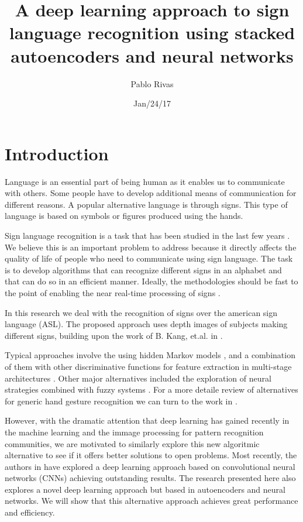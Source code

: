 \documentclass[a4paper]{article}
\title{A deep learning approach to sign language recognition using stacked 
autoencoders and neural networks}
\author{Pablo Rivas}
\date{Jan/24/17}
\begin{document}
\lstset{language=Python}

\maketitle

\section{Introduction}

Language is an essential part of being human as it enables us to communicate
with others. Some people have to develop additional means of communication
for different reasons. A popular alternative language is through signs. This
type of language is based on symbols or figures produced using the hands. 

Sign language recognition is a task that has been studied in the last few years
\cite{starner1998real}. We believe this is an important problem to address
because it directly affects the quality of life of people who need to
communicate using sign language. The task is to develop algorithms that can
recognize different signs in an alphabet and that can do so in an efficient
manner. Ideally, the methodologies should be fast to the point of enabling the 
near real-time processing of signs \cite{starner1997real}.

In this research we deal with the recognition of signs over the american sign
language (ASL). The proposed approach uses depth images of subjects making
different signs, building upon the work of B. Kang, et.al. in
\cite{kang2015real}. 

Typical approaches involve the using hidden Markov models
\cite{starner1997real}, and a combination of them with other discriminative
functions for feature extraction in multi-stage architectures
\cite{lichtenauer2008sign}. Other major alternatives included the exploration
of neural strategies combined with fuzzy systems \cite{al2001recognition}. For
a more detaile review of alternatives for generic hand gesture recognition we
can turn to the work in \cite{murthy2009review}.

However, with the dramatic attention that deep learning has gained recently 
in the machine learning and the immage processing for pattern recognition
communities, we are motivated to similarly explore this new algoritmic
alternative to see if it offers better solutions to open problems. Most
recently, the authors in \cite{kang2015real} have explored a deep learning
approach based on convolutional neural networks (CNNs) achieving outstanding
results. The research presented here also explores a novel deep learning
approach but based in autoencoders and neural networks. We will show that this
alternative approach achieves great performance and efficiency.
\end{document}
